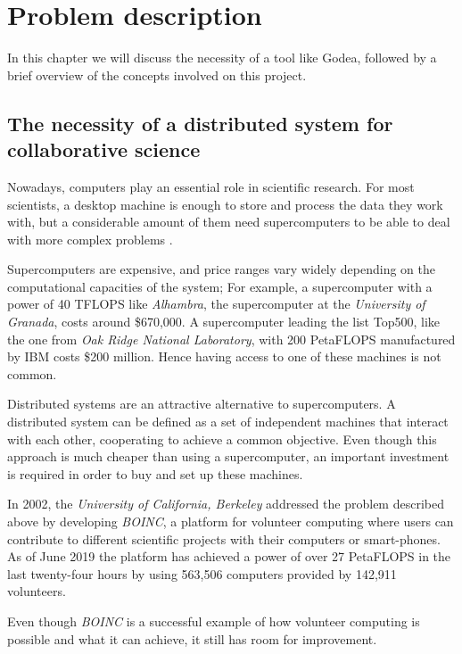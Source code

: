 \chapter{Problem description}

In this chapter we will discuss the necessity of a tool like Godea, followed by a brief overview of the concepts involved on this project.

\section{The necessity of a distributed system for collaborative science}
Nowadays, computers play an essential role in scientific research. For most scientists, a desktop machine is enough to store and process the data they work with, but a considerable amount of them need supercomputers to be able to deal with more complex problems \cite{computing-in-science}.

Supercomputers are expensive, and price ranges vary widely depending on the computational capacities of the system; For example, a supercomputer with a power of 40 TFLOPS like \textit{Alhambra}, the supercomputer at the \textit{University of Granada}, costs around \$670,000\cite{ideal-alhambra}. A supercomputer leading the list Top500,  like the one from \textit{Oak Ridge National Laboratory}, with 200 PetaFLOPS manufactured by IBM costs \$200 million\cite{oak-ridge}. Hence having access to one of these machines is not common.

Distributed systems are an attractive alternative to supercomputers. A distributed system can be defined as a set of independent machines that interact with each other, cooperating to achieve a common objective. Even though this approach is much cheaper than using a supercomputer, an important investment is required in order to buy and set up these machines.

In 2002, the \textit{University of California, Berkeley} addressed the problem described above by developing \textit{BOINC}\cite{boinc-website}, a platform for volunteer computing where users can contribute to different scientific projects with their computers or smart-phones. As of June 2019 the platform has achieved a power of over 27 PetaFLOPS in the last twenty-four hours by using 563,506 computers provided by 142,911 volunteers.

Even though \textit{BOINC} is a successful example of how volunteer computing is possible and what it can achieve, it still has room for improvement. 

